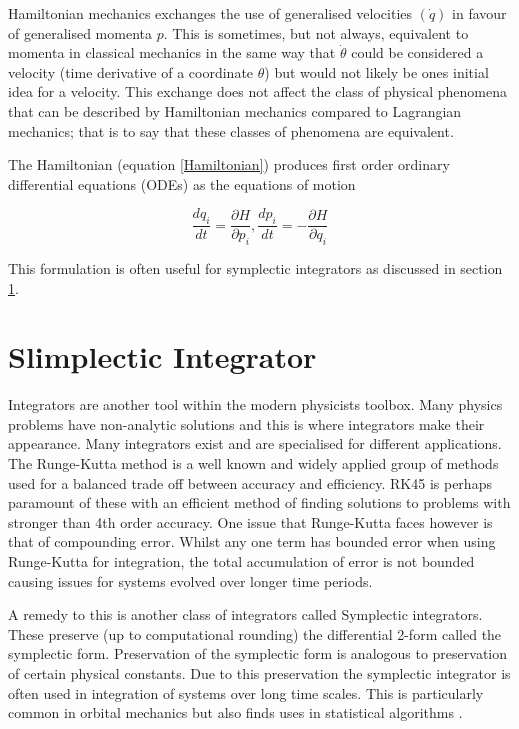 \documentclass[10pt]{iopart}
\begin{document}
Hamiltonian mechanics exchanges the use of generalised velocities $(\dot q)$ in favour of generalised momenta $p$. This is sometimes, but not always, equivalent to momenta in classical mechanics in the same way that $\dot\theta$ could be considered a velocity (time derivative of a coordinate $\theta$) but would not likely be ones initial idea for a velocity. This exchange does not affect the class of physical phenomena that can be described by Hamiltonian mechanics compared to Lagrangian mechanics; that is to say that these classes of phenomena are equivalent.

The Hamiltonian (equation \ref{Hamiltonian}) produces first order ordinary differential equations (ODEs) as the equations of motion

\begin{equation}
	\frac{dq_i}{dt} = \frac{\partial H}{\partial p_i}, \frac{dp_i}{dt} = -\frac{\partial H}{\partial q_i}
\end{equation}

This formulation is often useful for symplectic integrators \cite{SanzSerna} as discussed in section \ref{Symplectic}.

\section{Slimplectic Integrator}
\label{Symplectic}
Integrators are another tool within the modern physicists toolbox. Many physics problems have non-analytic solutions and this is where integrators make their appearance. Many integrators exist and are specialised for different applications. The Runge-Kutta method \cite{RungeKutta} is a well known and widely applied group of methods used for a balanced trade off between accuracy and efficiency. RK45 is perhaps paramount of these with an efficient method of finding solutions to problems with stronger than 4th order accuracy. One issue that Runge-Kutta faces however is that of compounding error. Whilst any one term has bounded error when using Runge-Kutta for integration, the total accumulation of error is not bounded causing issues for systems evolved over longer time periods. 

A remedy to this is another class of integrators called Symplectic integrators. These preserve (up to computational rounding) the differential 2-form called the symplectic form. Preservation of the symplectic form is analogous to preservation of certain physical constants. Due to this preservation the symplectic integrator is often used in integration of systems over long time scales. This is particularly common in orbital mechanics \cite{WISDOM, ReinTamayo} but also finds uses in statistical algorithms \cite{Neal_MCMC}.
\end{document}
